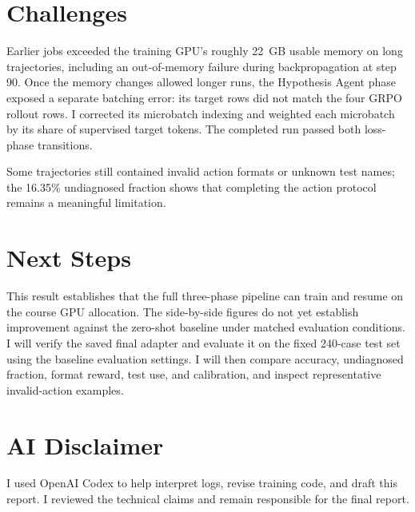 \documentclass[11pt]{article}
\begin{document}
\section{Challenges}

Earlier jobs exceeded the training GPU's roughly 22~GB usable memory on long
trajectories, including an out-of-memory failure during backpropagation at
step 90. Once the memory changes allowed longer runs, the Hypothesis Agent
phase exposed a separate batching error: its target rows did not match the
four GRPO rollout rows. I corrected its microbatch indexing and weighted each
microbatch by its share of supervised target tokens. The completed run passed
both loss-phase transitions.

Some trajectories still contained invalid action formats or unknown test
names; the 16.35\% undiagnosed fraction shows that completing the action
protocol remains a meaningful limitation.

\section{Next Steps}

This result establishes that the full three-phase pipeline can train and
resume on the course GPU allocation. The side-by-side figures do not yet
establish improvement against the zero-shot baseline under matched evaluation
conditions. I will verify the saved final adapter and
evaluate it on the fixed 240-case test set using the baseline evaluation
settings. I will then compare accuracy, undiagnosed fraction, format reward,
test use, and calibration, and inspect representative invalid-action examples.

\section{AI Disclaimer}

I used OpenAI Codex to help interpret logs, revise training code, and draft
this report. I reviewed the technical claims and remain responsible for the
final report.
\end{document}
